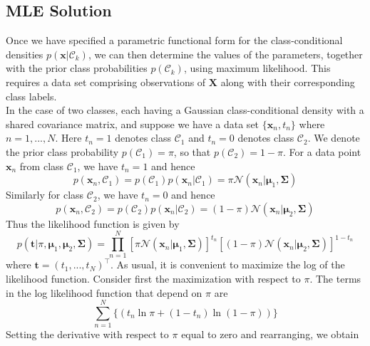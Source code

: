 \documentclass[twoside]{article}
\begin{document}
\subsection{MLE Solution}
Once we have specified a parametric functional form for the class-conditional densities $p(\boldsymbol{x}|\mathcal{C}_k)$, we can then determine the values of the parameters, together with the prior class probabilities $p(\mathcal{C}_k)$, using maximum likelihood. This requires a data set comprising observations of $\boldsymbol{X}$ along with their corresponding class labels.\\
In the case of two classes, each having a Gaussian class-conditional density with a shared covariance matrix, and suppose we have a data set $\{\boldsymbol{x}_n, t_n\}$ where $n = 1,..., N$. Here $t_n = 1$ denotes class $\mathcal{C}_1$ and $t_n = 0$ denotes class $\mathcal{C}_2$. We denote the prior class probability $p(\mathcal{C}_1) = \pi$, so that $p(\mathcal{C}_2) = 1 - \pi$. For a data point $\boldsymbol{x}_n$ from class $\mathcal{C}_1$, we have $t_n = 1$ and hence
\begin{equation*}
    p(\boldsymbol{x}_n, \mathcal{C}_1) = p(\mathcal{C}_1)p(\boldsymbol{x}_n| \mathcal{C}_1)=\pi\mathcal{N}(\boldsymbol{x}_n|\boldsymbol{\mu}_1, \boldsymbol{\Sigma})
\end{equation*}
Similarly for class $\mathcal{C}_2$, we have $t_n = 0$ and hence
\begin{equation*}
     p(\boldsymbol{x}_n, \mathcal{C}_2) = p(\mathcal{C}_2)p(\boldsymbol{x}_n| \mathcal{C}_2)=(1 -\pi)\mathcal{N}(\boldsymbol{x}_n|\boldsymbol{\mu}_2, \boldsymbol{\Sigma})
\end{equation*}
Thus the likelihood function is given by
\begin{equation*}
    p(\boldsymbol{t}|\pi, \boldsymbol{\mu}_1, \boldsymbol{\mu}_2, \boldsymbol{\Sigma}) = \prod\limits_{n = 1}^{N} [\pi\mathcal{N}(\boldsymbol{x}_n|\boldsymbol{\mu}_1, \boldsymbol{\Sigma})]^{t_n}[(1 -\pi)\mathcal{N}(\boldsymbol{x}_n|\boldsymbol{\mu}_2, \boldsymbol{\Sigma})]^{1 - t_n}
\end{equation*}
where $\boldsymbol{t} = (t_1,...,t_N)^\intercal$. As usual, it is convenient to maximize the log of the likelihood function. Consider first the maximization with respect to $\pi$. The terms in the log likelihood function that depend on $\pi$ are
\begin{equation*}
    \sum\limits_{n = 1}^{N}\{(t_n\ln{\pi} + (1 - t_n)\ln{(1 - \pi)})\}
\end{equation*}
Setting the derivative with respect to $\pi$ equal to zero and rearranging, we obtain
\end{document}
